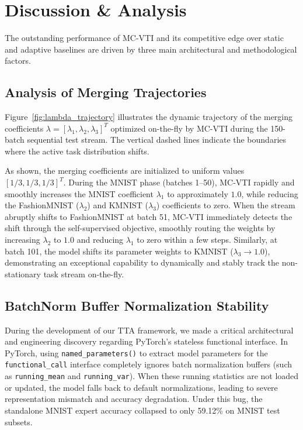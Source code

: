 \documentclass{article}
\theoremstyle{plain}
\theoremstyle{definition}
\theoremstyle{remark}
\begin{document}
\section{Discussion \& Analysis}
\label{sec:discussion}
The outstanding performance of MC-VTI and its competitive edge over static and adaptive baselines are driven by three main architectural and methodological factors.

\subsection{Analysis of Merging Trajectories}
Figure~\ref{fig:lambda_trajectory} illustrates the dynamic trajectory of the merging coefficients $\lambda = [\lambda_1, \lambda_2, \lambda_3]^T$ optimized on-the-fly by MC-VTI during the 150-batch sequential test stream. The vertical dashed lines indicate the boundaries where the active task distribution shifts. 

As shown, the merging coefficients are initialized to uniform values $[1/3, 1/3, 1/3]^T$. During the MNIST phase (batches 1--50), MC-VTI rapidly and smoothly increases the MNIST coefficient $\lambda_1$ to approximately $1.0$, while reducing the FashionMNIST ($\lambda_2$) and KMNIST ($\lambda_3$) coefficients to zero. When the stream abruptly shifts to FashionMNIST at batch 51, MC-VTI immediately detects the shift through the self-supervised objective, smoothly routing the weights by increasing $\lambda_2$ to $1.0$ and reducing $\lambda_1$ to zero within a few steps. Similarly, at batch 101, the model shifts its parameter weights to KMNIST ($\lambda_3 \to 1.0$), demonstrating an exceptional capability to dynamically and stably track the non-stationary task stream on-the-fly.

\subsection{BatchNorm Buffer Normalization Stability}
During the development of our TTA framework, we made a critical architectural and engineering discovery regarding PyTorch's stateless functional interface. In PyTorch, using \texttt{named\_parameters()} to extract model parameters for the \texttt{functional\_call} interface completely ignores batch normalization buffers (such as \texttt{running\_mean} and \texttt{running\_var}). When these running statistics are not loaded or updated, the model falls back to default normalizations, leading to severe representation mismatch and accuracy degradation. Under this bug, the standalone MNIST expert accuracy collapsed to only 59.12\% on MNIST test subsets.
\end{document}
